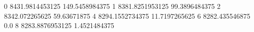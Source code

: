 0 8431.9814453125 149.5458984375
1 8381.8251953125 99.3896484375
2 8342.072265625 59.63671875
4 8294.1552734375 11.7197265625
6 8282.435546875 0.0
8 8283.8876953125 1.4521484375
